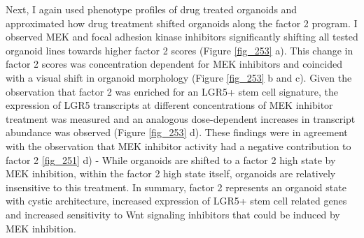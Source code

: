 \begin{flushleft}
Next, I again used phenotype profiles of drug treated organoids and approximated how drug treatment shifted organoids along the factor 2 program. I observed MEK and focal adhesion kinase inhibitors significantly shifting all tested organoid lines towards higher factor 2 scores (Figure \ref{fig_253} a). This change in factor 2 scores was concentration dependent for MEK inhibitors and coincided with a visual shift in organoid morphology (Figure \ref{fig_253} b and c). Given the observation that factor 2 was enriched for an LGR5+ stem cell signature, the expression of LGR5 transcripts at different concentrations of MEK inhibitor treatment was measured and an analogous dose-dependent increases in transcript abundance was observed (Figure \ref{fig_253} d). These findings were in agreement with the observation that MEK inhibitor activity had a negative contribution to factor 2 \ref{fig_251} d) - While organoids are shifted to a factor 2 high state by MEK inhibition, within the factor 2 high state itself, organoids are relatively insensitive to this treatment. In summary, factor 2 represents an organoid state with cystic architecture, increased expression of LGR5+ stem cell related genes and increased sensitivity to Wnt signaling inhibitors that could be induced by MEK inhibition.

\end{flushleft}

